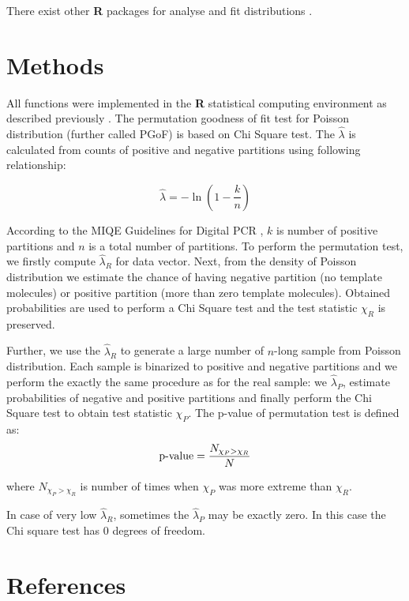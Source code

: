 \documentclass[review]{elsarticle}
\begin{document}
There exist other \textbf{R} packages for analyse and fit distributions \cite{fitdistrplus_2015}.

\section{Methods}
All functions were implemented in the \textbf{R} statistical computing 
environment as described previously \cite{rodiger_r_2015}. The permutation 
goodness of fit test for Poisson distribution (further called PGoF) is based on 
Chi Square test. The $\hat\lambda$ is calculated from counts of positive and 
negative partitions using following relationship:

\begin{equation}
\hat{\lambda} = - \ln \left(1 - \frac{k}{n} \right)
\end{equation}

According to the MIQE Guidelines for Digital PCR \cite{huggett_digital_2013}, $k$ is number of positive 
partitions and $n$ is a total number of partitions. To perform the permutation 
test, we firstly compute $\hat\lambda_R$ for data vector. Next, from the density 
of Poisson distribution we estimate the chance of having negative partition (no 
template molecules) or positive partition (more than zero template molecules). 
Obtained probabilities are used to perform a Chi Square test and the test 
statistic $\chi_R$ is preserved.

Further, we use the $\hat\lambda_R$ to generate a large number of $n$-long 
sample from Poisson distribution. Each sample is binarized to positive and 
negative partitions and we perform the exactly the same procedure as for the 
real sample: we $\hat\lambda_P$, estimate probabilities of negative and positive 
partitions and finally perform the Chi Square test to obtain test statistic 
$\chi_P$.
The p-value of permutation test is defined as:
\begin{equation}   
\textnormal{p-value} = \frac{N_{\chi_P > \chi_R}}{N}
\end{equation}

where $N_{\chi_P > \chi_R}$ is number of times when $\chi_P$ was more extreme than $\chi_R$.

In case of very low $\hat\lambda_R$, sometimes the $\hat\lambda_P$ may be 
exactly zero. In this case the Chi square test has 0 degrees of freedom. 

\section*{References}


\end{document}
